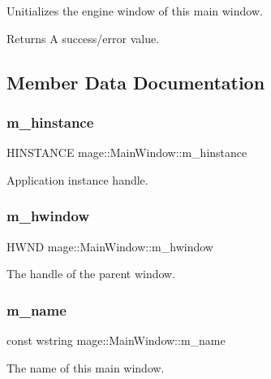 Unitializes the engine window of this main window.

\begin{DoxyReturn}{Returns}
A success/error value. 
\end{DoxyReturn}


\subsection{Member Data Documentation}
\hypertarget{classmage_1_1_main_window_a389348c5949b2cb464a8236bfcff00ef}{}\label{classmage_1_1_main_window_a389348c5949b2cb464a8236bfcff00ef} 
\subsubsection{\texorpdfstring{m\+\_\+hinstance}{m\_hinstance}}
{\footnotesize\ttfamily H\+I\+N\+S\+T\+A\+N\+CE mage\+::\+Main\+Window\+::m\+\_\+hinstance\hspace{0.3cm}{\ttfamily [private]}}

Application instance handle. \hypertarget{classmage_1_1_main_window_afc9afabcf8a52d79f02c8352451863cc}{}\label{classmage_1_1_main_window_afc9afabcf8a52d79f02c8352451863cc} 
\subsubsection{\texorpdfstring{m\+\_\+hwindow}{m\_hwindow}}
{\footnotesize\ttfamily H\+W\+ND mage\+::\+Main\+Window\+::m\+\_\+hwindow\hspace{0.3cm}{\ttfamily [private]}}

The handle of the parent window. \hypertarget{classmage_1_1_main_window_a3d8eba5081df97c68b1f2aa7e5d5cb1c}{}\label{classmage_1_1_main_window_a3d8eba5081df97c68b1f2aa7e5d5cb1c} 
\subsubsection{\texorpdfstring{m\+\_\+name}{m\_name}}
{\footnotesize\ttfamily const wstring mage\+::\+Main\+Window\+::m\+\_\+name\hspace{0.3cm}{\ttfamily [private]}}

The name of this main window. 